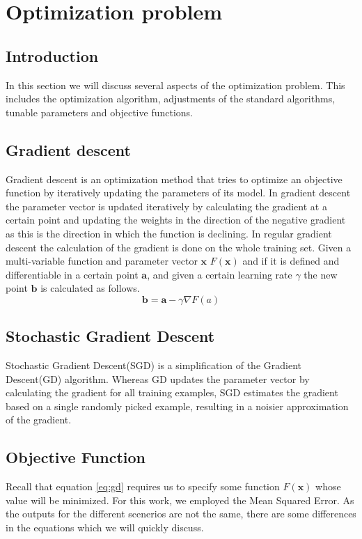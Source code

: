 \section{Optimization problem}
\subsection{Introduction}
In this section we will discuss several aspects of the optimization problem. This includes the optimization algorithm, adjustments of the standard algorithms, tunable parameters and objective functions.
\subsection{Gradient descent}%
Gradient descent is an optimization method that tries to optimize an objective function by iteratively updating the parameters of its model.
In gradient descent the parameter vector is updated iteratively by calculating the gradient at a certain point and updating the weights in the direction of the negative gradient as this is the direction in which the function is declining. 
In regular gradient descent the calculation of the gradient is done on the whole training set. Given a multi-variable function and parameter vector $\mathbf{x}$
$F(\mathbf{x})$ and if it is defined and differentiable in a certain point $\mathbf{a}$, and given a
certain learning rate $\gamma$  the new point $\mathbf{b}$ is calculated as follows.
\begin{equation} \label{eq:gd}
 \mathbf{b} = \mathbf{a} - \gamma \nabla F(a)
\end{equation}
 \subsection{Stochastic Gradient Descent} 
 Stochastic Gradient Descent(SGD) is a simplification of the Gradient Descent(GD) algorithm. Whereas GD updates the parameter vector by calculating the gradient for all training examples, SGD estimates
 the gradient based on a single randomly picked example, resulting in a noisier approximation of the gradient.
 \subsection{Objective Function}\label{section:obj}
 Recall that equation \ref{eq:gd} requires us to specify some function $F(\mathbf{x})$ whose value will be minimized. For this work, we employed the Mean Squared Error. As the outputs for the different scenerios
 are not the same, there are some differences in the equations which we will quickly discuss.
